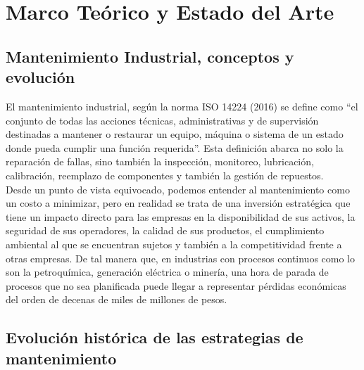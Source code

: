 %

\chapter{Marco Teórico y Estado del Arte}

\section{Mantenimiento Industrial, conceptos y evolución}

El mantenimiento industrial, según la norma ISO 14224 (2016) \cite{iso14224} se define como ``el conjunto de todas las acciones técnicas, administrativas y de supervisión destinadas
a mantener o restaurar un equipo, máquina o sistema de un estado donde pueda cumplir una función requerida''. Esta definición abarca no solo la reparación de fallas, sino también la inspección, 
monitoreo, lubricación, calibración, reemplazo de componentes y también la gestión de repuestos.\\[.15cm]

Desde un punto de vista equivocado, podemos entender al mantenimiento como un costo a minimizar, pero en realidad se trata de una inversión estratégica que tiene un impacto directo 
para las empresas en la disponibilidad de sus activos, la seguridad de sus operadores, la calidad de sus productos, el cumplimiento ambiental al que se encuentran sujetos y también a 
la competitividad frente a otras empresas. De tal manera que, en industrias con procesos continuos como lo son la petroquímica, generación eléctrica o minería, una hora de parada de 
procesos que no sea planificada puede llegar a representar pérdidas económicas del orden de decenas de miles de millones de pesos.

\section{Evolución histórica de las estrategias de mantenimiento}

